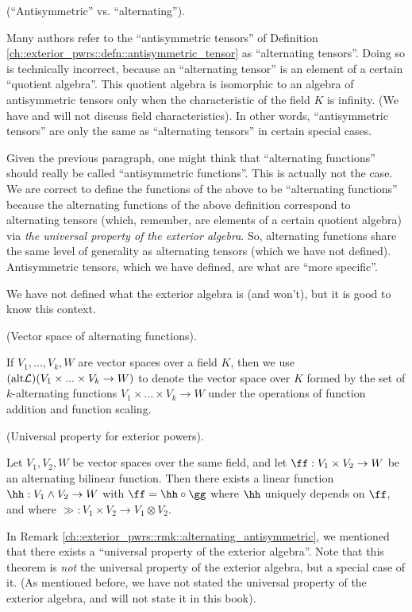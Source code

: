 \begin{remark}
\label{ch::exterior_pwrs::rmk::alternating_antisymmetric}

    (``Antisymmetric'' vs. ``alternating'').
    
    Many authors refer to the ``antisymmetric tensors'' of Definition \ref{ch::exterior_pwrs::defn::antisymmetric_tensor} as ``alternating tensors''. Doing so is technically incorrect, because an ``alternating tensor'' is an element of a certain ``quotient algebra''. This quotient algebra is isomorphic to an algebra of antisymmetric tensors only when the characteristic of the field $K$ is infinity. (We have and will not discuss field characteristics). In other words, ``antisymmetric tensors'' are only the same as ``alternating tensors'' in certain special cases.
    
    Given the previous paragraph, one might think that ``alternating functions'' should really be called ``antisymmetric functions''. This is actually not the case. We are correct to define the functions of the above to be ``alternating functions'' because the alternating functions of the above definition correspond to alternating tensors (which, remember, are elements of a certain quotient algebra) via \textit{the universal property of the exterior algebra}. So, alternating functions share the same level of generality as alternating tensors (which we have not defined). Antisymmetric tensors, which we have defined, are what are ``more specific''.
    
    We have not defined what the exterior algebra is (and won't), but it is good to know this context.
\end{remark}

\begin{defn}
    (Vector space of alternating functions).
    
    If $V_1, ..., V_k, W$ are vector spaces over a field $K$, then we use $(\text{alt} \mathcal{L})(V_1 \times ... \times V_k \rightarrow W)$ to denote the vector space over $K$ formed by the set of $k$-alternating functions $V_1 \times ... \times V_k \rightarrow W$ under the operations of function addition and function scaling.
\end{defn}

\begin{theorem}
    (Universal property for exterior powers).
    
    Let $V_1, V_2, W$ be vector spaces over the same field, and let $\ff:V_1 \times V_2 \rightarrow W$ be an alternating bilinear function. Then there exists a linear function $\hh:V_1 \wedge V_2 \rightarrow W$ with $\ff = \hh \circ \gg$ where $\hh$ uniquely depends on $\ff$, and where $\gg:V_1 \times V_2 \rightarrow V_1 \otimes V_2$.
    
    In Remark \ref{ch::exterior_pwrs::rmk::alternating_antisymmetric}, we mentioned that there exists a ``universal property of the exterior algebra''. Note that this theorem is \textit{not} the universal property of the exterior algebra, but a special case of it. (As mentioned before, we have not stated the universal property of the exterior algebra, and will not state it in this book).
\end{theorem}

